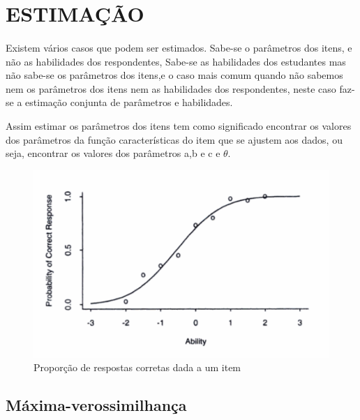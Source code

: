 \section{ESTIMAÇÃO}
	\paragraph{}
    	Existem vários casos que podem ser estimados. Sabe-se o parâmetros dos itens, e não as habilidades dos respondentes, 
    	Sabe-se as habilidades dos estudantes mas não sabe-se os parâmetros dos itens,e o caso mais comum quando não sabemos nem os parâmetros dos itens nem as habilidades dos respondentes, neste caso faz-se a estimação conjunta de parâmetros e habilidades.
	\par
	    Assim estimar os parâmetros dos itens tem como significado encontrar os valores dos parâmetros da função características do item que se ajustem aos dados, ou seja, encontrar os valores dos parâmetros a,b e c e $\theta$.
	\begin{figure}[!h]
	    \centering
	    \includegraphics[width=0.6\linewidth]{img/proporcao}
	    \caption{Proporção de respostas corretas dada a um item}
	    \label{fig:proporcao}
	\end{figure}
	
	\subsection{Máxima-verossimilhança}
